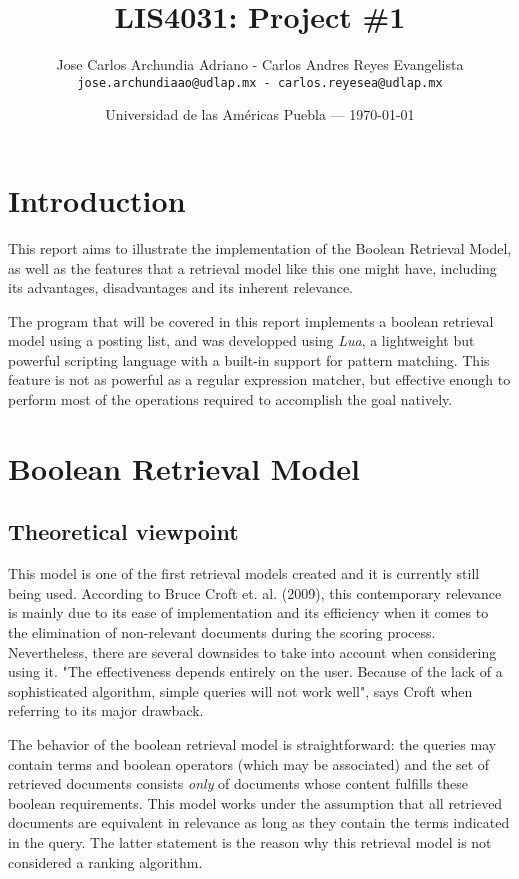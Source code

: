 \documentclass{article}
\title{LIS4031: Project \#1} %
\author{Jose Carlos Archundia Adriano - Carlos Andres Reyes Evangelista\\ \texttt{jose.archundiaao@udlap.mx - carlos.reyesea@udlap.mx}} %
\date{Universidad de las Am\'ericas  Puebla --- \today} %
\begin{document}
\maketitle %


\section*{Introduction} %
This report aims to illustrate the implementation of the Boolean Retrieval Model, as well as the features that a retrieval model like this one might have, including its advantages, disadvantages and its inherent relevance.

The program that will be covered in this report implements a boolean retrieval model using a posting list, and was developped using \textit{Lua}, a lightweight but powerful scripting language with a built-in support for pattern matching. This feature is not as powerful as a regular expression matcher, but effective enough to perform most of the operations required to accomplish the goal natively.


\section{Boolean Retrieval Model}

\subsection{Theoretical viewpoint}
This model is one of the first retrieval models created and it is currently still being used. According to Bruce Croft et. al. (2009), this contemporary relevance is mainly due to its ease of implementation and its efficiency when it comes to the elimination of non-relevant documents during the scoring process. Nevertheless, there are several downsides to take into account when considering using it. "The effectiveness depends entirely on the user. Because of the lack of a sophisticated algorithm, simple queries will not work well", says Croft when referring to its major drawback.

The behavior of the boolean retrieval model is straightforward: the queries may contain terms and boolean operators (which may be associated) and the set of retrieved documents consists \textit{only} of documents whose content fulfills these boolean requirements. This model works under the assumption that all retrieved documents are equivalent in relevance as long as they contain the terms indicated in the query. The latter statement is the reason why this retrieval model is not considered a ranking algorithm.
\end{document}
